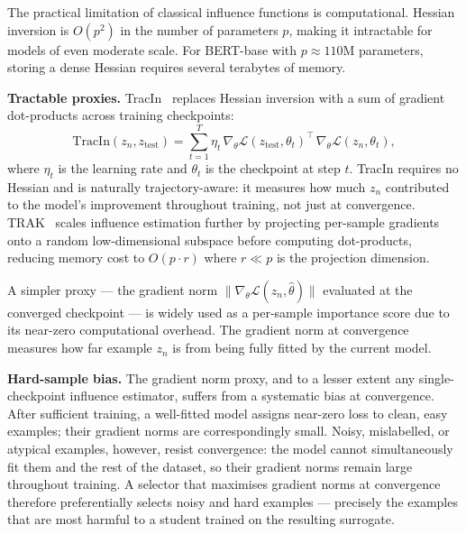 \begin{foldable}
  The practical limitation of classical influence functions is computational. Hessian inversion is $O(p^2)$ in the number of parameters $p$, making it intractable for models of even moderate scale.
  For BERT-base with $p \approx 110$M parameters, storing a dense Hessian requires several terabytes of memory.
\end{foldable}

\begin{foldable}
  \textbf{Tractable proxies.}
  TracIn~\cite{pruthi2020estimating} replaces Hessian inversion with a sum of gradient dot-products across training checkpoints:
  \begin{equation}
    \mathrm{TracIn}(z_n, z_{\text{test}}) = \sum_{t=1}^{T} \eta_t \,
    \nabla_\theta \mathcal{L}(z_{\text{test}}, \theta_t)^\top \,
    \nabla_\theta \mathcal{L}(z_n, \theta_t),
    \label{eq:tracin}
  \end{equation}
  where $\eta_t$ is the learning rate and $\theta_t$ is the checkpoint at step $t$.
  TracIn requires no Hessian and is naturally trajectory-aware: it measures how much $z_n$ contributed to the model's improvement throughout training, not just at convergence.
  TRAK~\cite{park2023trak} scales influence estimation further by projecting per-sample gradients onto a random low-dimensional subspace before computing dot-products, reducing memory cost to $O(p \cdot r)$ where $r \ll p$ is the projection dimension.
\end{foldable}

\begin{foldable}
  A simpler proxy --- the gradient norm $\|\nabla_\theta \mathcal{L}(z_n, \hat\theta)\|$ evaluated at the converged checkpoint --- is widely used as a per-sample importance score due to its near-zero computational overhead.
  The gradient norm at convergence measures how far example $z_n$ is from being fully fitted by the current model.
\end{foldable}

\begin{foldable}
  \textbf{Hard-sample bias.}
  The gradient norm proxy, and to a lesser extent any single-checkpoint influence estimator, suffers from a systematic bias at convergence.
  After sufficient training, a well-fitted model assigns near-zero loss to clean, easy examples; their gradient norms are correspondingly small.
  Noisy, mislabelled, or atypical examples, however, resist convergence: the model cannot simultaneously fit them and the rest of the dataset, so their gradient norms remain large throughout training.
  A selector that maximises gradient norms at convergence therefore preferentially selects noisy and hard examples --- precisely the examples that are most harmful to a student trained on the resulting surrogate.
\end{foldable}

